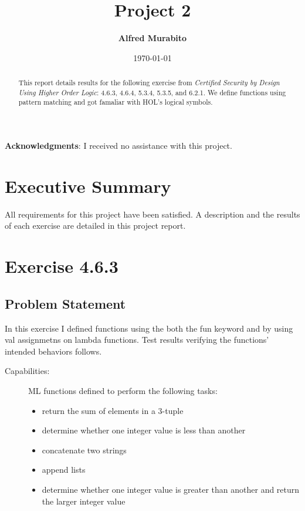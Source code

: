 \documentclass[letterpaper]{report}
\title{Project 2}
\author{\textbf{Alfred Murabito}}
\date{\today}
\begin{document}
\maketitle{}

\begin{abstract}
\noindent{}This report details results for the following exercise from \textit{Certified Security by Design Using Higher Order Logic}: 4.6.3, 4.6.4, 5.3.4, 5.3.5, and 6.2.1.  
We define functions using pattern matching and got famaliar with HOL's logical symbols.
\end{abstract}

\newpage

\textbf{Acknowledgments}: I received no assistance with this project.

\newpage

\tableofcontents

\newpage

\chapter{Executive Summary}
\label{sec:executive-summary}

All requirements for this project have been satisfied.  A description and the results of each exercise are detailed in this project report.  

\newpage

\chapter{Exercise 4.6.3}
\label{sec:ex-4-6-3}

\section{Problem Statement}

In this exercise I defined functions using the both the fun keyword and by using val assignmetns
on lambda functions. Test results verifying the functions' intended behaviors follows.

\begin{description}
\item[Capabilities:] ML functions defined to perform the following tasks:
   \begin{itemize}
   \item return the sum of elements in a 3-tuple
   \item determine whether one integer value is less than another
   \item concatenate two strings
   \item append lists
   \item determine whether one integer value is greater than another and return the larger integer value
   \end{itemize}
\end{description}
\end{document}
